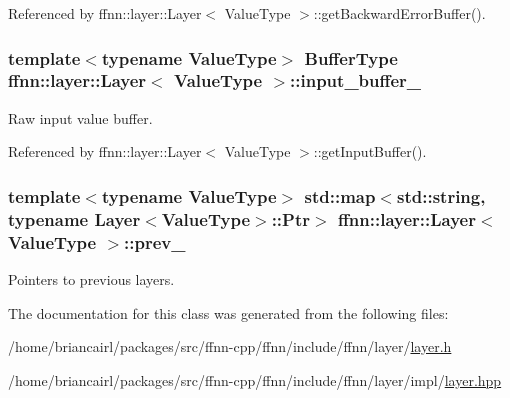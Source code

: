 Referenced by ffnn\-::layer\-::\-Layer$<$ Value\-Type $>$\-::get\-Backward\-Error\-Buffer().

\hypertarget{classffnn_1_1layer_1_1_layer_ad4b5ac0708d6ada04d62df4fad377f1a}{
\subsubsection[{input\-\_\-buffer\-\_\-}]{\setlength{\rightskip}{0pt plus 5cm}template$<$typename Value\-Type$>$ {\bf Buffer\-Type} {\bf ffnn\-::layer\-::\-Layer}$<$ Value\-Type $>$\-::input\-\_\-buffer\-\_\-\hspace{0.3cm}{\ttfamily [protected]}}}\label{classffnn_1_1layer_1_1_layer_ad4b5ac0708d6ada04d62df4fad377f1a}


Raw input value buffer. 



Referenced by ffnn\-::layer\-::\-Layer$<$ Value\-Type $>$\-::get\-Input\-Buffer().

\hypertarget{classffnn_1_1layer_1_1_layer_ab1546472cf5b9c87aed6f75852e123c7}{
\subsubsection[{prev\-\_\-}]{\setlength{\rightskip}{0pt plus 5cm}template$<$typename Value\-Type$>$ std\-::map$<$std\-::string, typename {\bf Layer}$<$Value\-Type$>$\-::{\bf Ptr}$>$ {\bf ffnn\-::layer\-::\-Layer}$<$ Value\-Type $>$\-::prev\-\_\-\hspace{0.3cm}{\ttfamily [protected]}}}\label{classffnn_1_1layer_1_1_layer_ab1546472cf5b9c87aed6f75852e123c7}


Pointers to previous layers. 



The documentation for this class was generated from the following files\-:\begin{DoxyCompactItemize}
\item 
/home/briancairl/packages/src/ffnn-\/cpp/ffnn/include/ffnn/layer/\hyperlink{layer_8h}{layer.\-h}\item 
/home/briancairl/packages/src/ffnn-\/cpp/ffnn/include/ffnn/layer/impl/\hyperlink{layer_8hpp}{layer.\-hpp}\end{DoxyCompactItemize}
